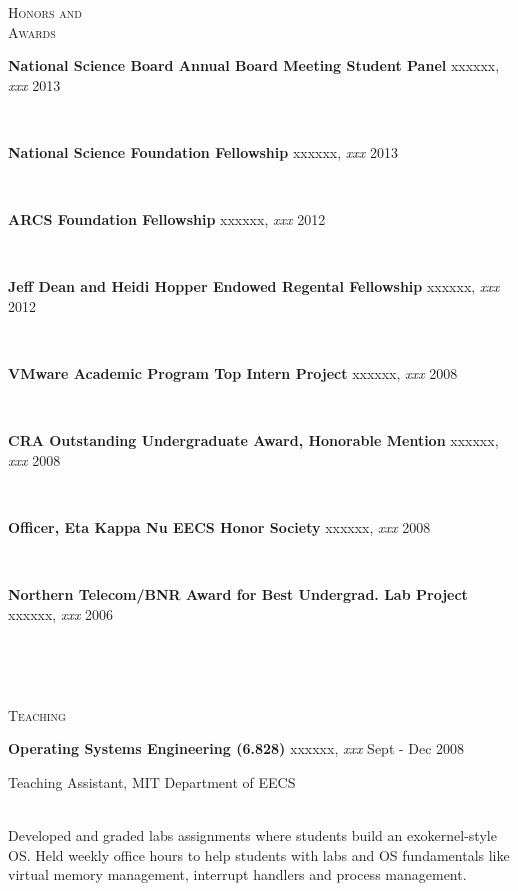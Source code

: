 \documentclass[10pt,times]{report}
\newlength{\sectiongap}
\newlength{\entrygap}
\newlength{\sectioncolwidth}
\newlength{\colgap}
\newlength{\stuffwidth}
\def\ifEqString#1#2{\def\testa{#1}\def\testb{#2}%
  \ifx\testa\testb}
\newenvironment{rtable}{
  \begin{minipage}{\textwidth}
  }{
  \end{minipage}
}
\newenvironment{rentry}[3][xxx]{
  \begin{minipage}[t]{\hsize}
    \textbf{#2}\ifEqString{#1}{xxx}\relax\else, \textit{#1}\fi
    \hspace{\stretch{1}} #3 \\
  }{
    \removelastskip
  \end{minipage}
  \\[\entrygap]  %
}
\newcommand{\rline}[2]{
  \begin{minipage}[t]{\hsize}
    #1 \hspace{\stretch{1}} #2
  \end{minipage} \\
}
\newenvironment{rsection}[1]{
  \begin{minipage}[t]{\sectioncolwidth}
    \textsc{#1}
  \end{minipage}
  \hspace{\colgap}
  \begin{minipage}[t]{\stuffwidth}
  }{
    \removelastskip
  \end{minipage}
  \\[\sectiongap]
}
\begin{document}
\begin{rtable}
  \vspace{1.0em}
  \begin{rsection}{Honors and\\Awards}
    \begin{rentry}{National Science Board Annual Board Meeting Student
        Panel}{2013}
    \end{rentry} \vspace{-0.5em}

    \begin{rentry}{National Science Foundation Fellowship}{2013}
    \end{rentry} \vspace{-0.5em}

    \begin{rentry}{ARCS Foundation Fellowship}{2012}
    \end{rentry} \vspace{-0.5em}

    \begin{rentry}{Jeff Dean and Heidi Hopper Endowed Regental Fellowship}{2012}
    \end{rentry} \vspace{-0.5em}

    \begin{rentry}{VMware Academic Program Top Intern Project}{2008}
    \end{rentry} \vspace{-0.5em}
    
    \begin{rentry}{CRA Outstanding Undergraduate Award, Honorable
      Mention}{2008}
    \end{rentry} \vspace{-0.5em}

    \begin{rentry}{Officer, Eta Kappa Nu EECS Honor Society}{2008}
    \end{rentry} \vspace{-0.5em}

    \begin{rentry}{Northern Telecom/BNR Award for Best Undergrad. Lab Project}{2006}
    \end{rentry}
  \end{rsection}


  \begin{rsection}{Teaching}
    \begin{rentry}{Operating Systems Engineering (6.828)}{Sept - Dec
        2008}
      \rline{Teaching Assistant, MIT Department of EECS}{} 
      Developed and graded labs assignments where students build an
      exokernel-style OS. Held weekly office hours to help students
      with labs and OS fundamentals like virtual memory management,
      interrupt handlers and process management.
    \end{rentry}    


\end{rsection}
\end{rtable}
\end{document}
